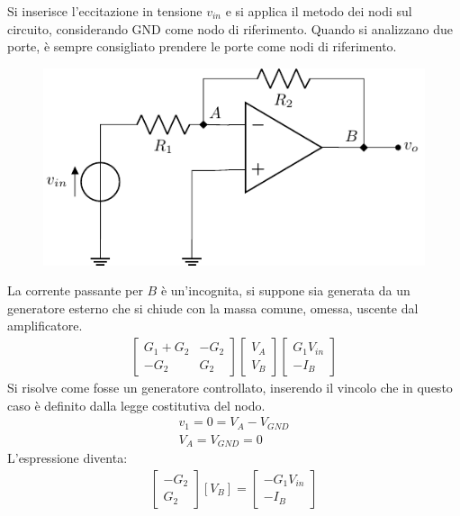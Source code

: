 \documentclass{article}
\numberwithin{equation}{subsection}
\begin{document}
Si inserisce l'eccitazione in tensione $v_{in}$ e si applica il metodo dei nodi sul circuito, considerando GND come 
nodo di riferimento. Quando si analizzano due porte, è sempre 
consigliato prendere le porte come nodi di riferimento. 
\begin{figure}[H]%
    \centering
    \includegraphics{amplificazione-invertente.pdf}%
    \label{fig:amplificazione-invertente}
\end{figure}
La corrente passante per $B$ è un'incognita, si suppone sia generata da un generatore esterno che si chiude con la massa comune, omessa, uscente dal 
amplificatore. 
\begin{gather*}
    \begin{bmatrix}
        G_1+G_2&-G_2\\-G_2&G_2
    \end{bmatrix}\begin{bmatrix}
        V_A\\V_B
    \end{bmatrix}\begin{bmatrix}
        G_1V_{in}\\
        -I_B
    \end{bmatrix}
\end{gather*}
Si risolve come fosse un generatore controllato, inserendo il vincolo che in questo caso è definito dalla legge costitutiva del nodo. 
\begin{gather*}
    v_1=0=V_A-V_{GND}\\
    V_A=V_{{GND}}=0
\end{gather*}
L'espressione diventa:
\begin{gather*}
    \begin{bmatrix}
        -G_2\\G_2
    \end{bmatrix}[V_B]=\begin{bmatrix}
        -G_1V_{in}\\-I_B
    \end{bmatrix}
\end{gather*}
\end{document}
